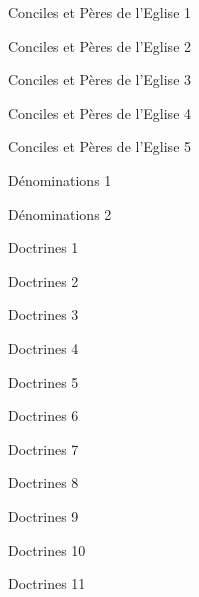 \documentclass[11pt]{book}
\begin{document}
\clearpage
\begin{center}Conciles et Pères de l'Eglise 1\end{center}\clearpage
\begin{center}Conciles et Pères de l'Eglise 2\end{center}\clearpage
\begin{center}Conciles et Pères de l'Eglise 3\end{center}\clearpage
\begin{center}Conciles et Pères de l'Eglise 4\end{center}\clearpage
\begin{center}Conciles et Pères de l'Eglise 5\end{center}\clearpage
\clearpage
\begin{center}Dénominations 1\end{center}\clearpage
\begin{center}Dénominations 2\end{center}\clearpage
\clearpage
\begin{center}Doctrines 1\end{center}\clearpage
\begin{center}Doctrines 2\end{center}\clearpage
\begin{center}Doctrines 3\end{center}\clearpage
\begin{center}Doctrines 4\end{center}\clearpage
\begin{center}Doctrines 5\end{center}\clearpage
\begin{center}Doctrines 6\end{center}\clearpage
\begin{center}Doctrines 7\end{center}\clearpage
\begin{center}Doctrines 8\end{center}\clearpage
\begin{center}Doctrines 9\end{center}\clearpage
\begin{center}Doctrines 10\end{center}\clearpage
\begin{center}Doctrines 11\end{center}\clearpage
\end{document}
